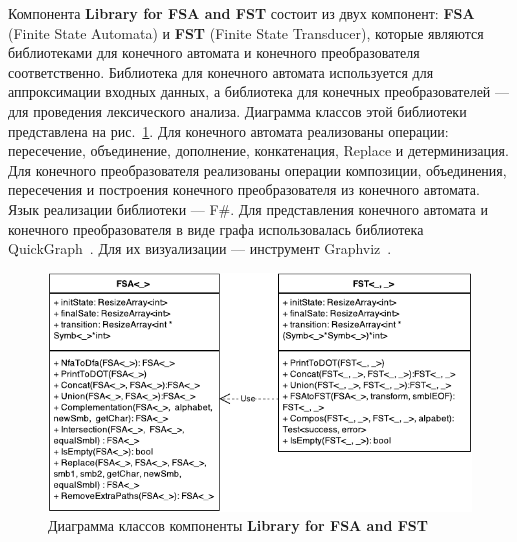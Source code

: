 Компонента \textbf{Library for FSA and FST} состоит из двух компонент: \textbf{FSA} (Finite State Automata) и \textbf{FST} (Finite State Transducer), которые являются библиотеками для конечного автомата и конечного преобразователя соответственно. Библиотека для конечного автомата используется для аппроксимации входных данных, а библиотека для конечных преобразователей --- для проведения лексического анализа. Диаграмма классов этой библиотеки представлена на рис.~\ref{fig:ClassLib}. Для конечного автомата реализованы операции: пересечение, объединение, дополнение, конкатенация, Replace и детерминизация. Для конечного преобразователя реализованы операции композиции, объединения, пересечения и построения конечного преобразователя из конечного автомата. Язык реализации библиотеки --- F\#. Для представления конечного автомата и конечного преобразователя в виде графа использовалась библиотека QuickGraph~\cite{QuickGraph}. Для их визуализации --- инструмент Graphviz~\cite{Graphviz}.

\begin{figure}[H]
\begin{center}
\includegraphics[width=1.0\textwidth]{Polubelova/ClassDiagramLib}
\caption{Диаграмма классов компоненты \textbf{Library for FSA and FST} }
\label{fig:ClassLib} 
\end{center}
\end{figure}

